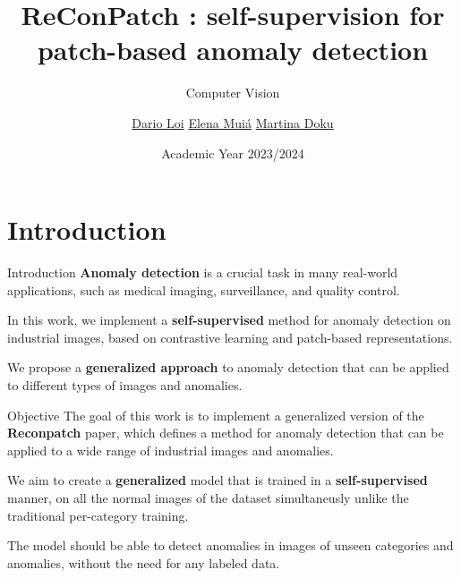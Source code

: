 \documentclass{beamer}
\title{ReConPatch : self-supervision for patch-based anomaly detection}
\subtitle{Computer Vision}
\author{\href{mailto:loi.1940849@studenti.uniroma1.it}{Dario Loi} \hspace{1em} \href{mailto:muia.1938610@studenti.uniroma1.it}{Elena Muiá} \hspace{1em} \href{mailto:doku.1938629@studenti.uniroma1.it}{Martina Doku}\\}
\date{Academic Year 2023/2024}
\begin{document}
\maketitle

\section{Introduction}
\begin{frame}{Introduction}
      \textbf{Anomaly detection} is a crucial task in many real-world applications,
       such as medical imaging, surveillance, and quality control.\newline 


        In this work, we implement a \textbf{self-supervised} method for anomaly detection
         on industrial images, based on contrastive learning and patch-based
          representations.\newline

          We propose a \textbf{generalized approach} to anomaly detection that can be applied
           to different types of images and anomalies.
          
\end{frame}
\begin{frame}{Objective}
      The goal of this work is to implement a generalized version of the \textbf{Reconpatch} \cite{reconpatch} paper, 
      which defines
       a method for anomaly detection that can be applied to a wide range of industrial images and anomalies.\newline

        We aim to create a \textbf{generalized} model that is 
        trained in a \textbf{self-supervised} manner, on all the normal images of the
         dataset simultaneusly unlike the traditional per-category training.\newline

          The model should be able to detect anomalies in images of unseen categories
           and anomalies, without the need for any labeled data.
\end{frame}
\end{document}
